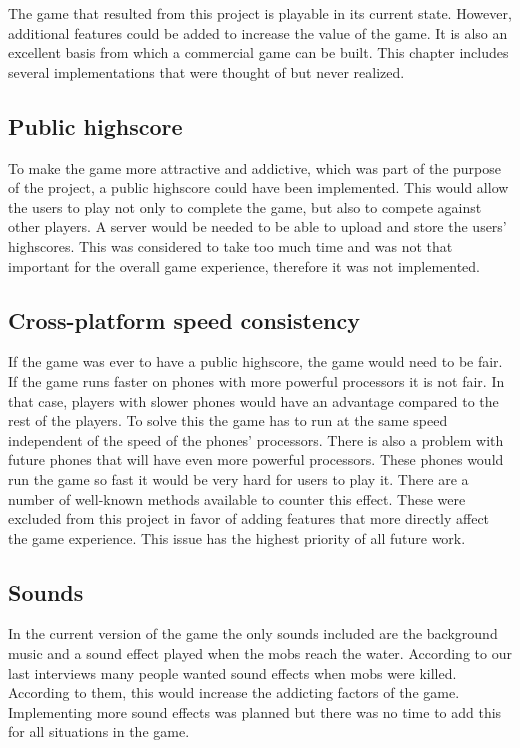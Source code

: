 The game that resulted from this project is playable in its current state. However, additional features could be added to increase the value of the game. It is also an excellent basis from which a commercial game can be built. This chapter includes several implementations that were thought of but never realized.

\subsection{Public highscore}

To make the game more attractive and addictive, which was part of the purpose of the project, a public highscore could have been implemented. This would allow the users to play not only to complete the game, but also to compete against other players. A server would be needed to be able to upload and store the users' highscores. This was considered to take too much time and was not that important for the overall game experience, therefore it was not implemented.
\subsection{Cross-platform speed consistency}

If the game was ever to have a public highscore, the game would need to be fair. If the game runs faster on phones with more powerful processors it is not fair. In that case, players with slower phones would have an advantage compared to the rest of the players. To solve this the game has to run at the same speed independent of the speed of the phones' processors. There is also a problem with future phones that will have even more powerful processors. These phones would run the game so fast it would be very hard for users to play it. There are a number of well-known methods available to counter this effect. These were excluded from this project in favor of adding features that more directly affect the game experience. This issue has the highest priority of all future work.
\subsection{Sounds}

In the current version of the game the only sounds included are the background music and a sound effect played when the mobs reach the water. According to our last interviews many people wanted sound effects when mobs were killed. According to them, this would increase the addicting factors of the game. Implementing more sound effects was planned but there was no time to add this for all situations in the game.
